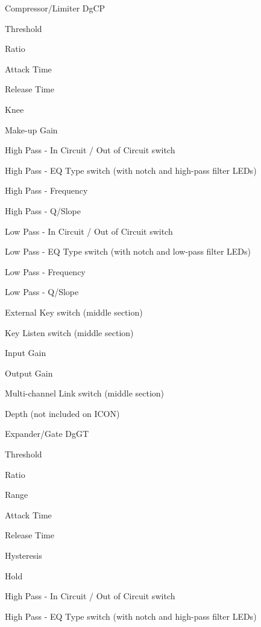 \begin{DoxyItemize}
\item Compressor/\+Limiter {\ttfamily \textquotesingle{}Dg\+CP\textquotesingle{}}  
\begin{DoxyEnumerate}
\item Threshold  
\item Ratio  
\item Attack Time  
\item Release Time  
\item Knee  
\item Make-\/up Gain  
\item High Pass -\/ In Circuit / Out of Circuit switch  
\item High Pass -\/ EQ Type switch (with notch and high-\/pass filter L\+E\+Ds) 
\item High Pass -\/ Frequency  
\item High Pass -\/ Q/\+Slope  
\item Low Pass -\/ In Circuit / Out of Circuit switch  
\item Low Pass -\/ EQ Type switch (with notch and low-\/pass filter L\+E\+Ds) 
\item Low Pass -\/ Frequency  
\item Low Pass -\/ Q/\+Slope  
\item External Key switch (middle section)  
\item Key Listen switch (middle section)  
\item Input Gain  
\item Output Gain  
\item Multi-\/channel Link switch (middle section)  
\item Depth (not included on I\+C\+ON)  
\end{DoxyEnumerate}
\item Expander/\+Gate {\ttfamily \textquotesingle{}Dg\+GT\textquotesingle{}}  
\begin{DoxyEnumerate}
\item Threshold  
\item Ratio  
\item Range  
\item Attack Time  
\item Release Time  
\item Hysteresis  
\item Hold  
\item High Pass -\/ In Circuit / Out of Circuit switch  
\item High Pass -\/ EQ Type switch (with notch and high-\/pass filter L\+E\+Ds) 

\end{DoxyEnumerate}
\end{DoxyItemize}
